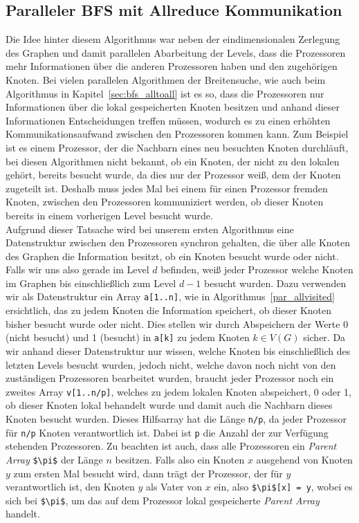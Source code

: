 \documentclass[11pt,a4paper]{article}
\begin{document}
\subsection{Paralleler BFS mit Allreduce Kommunikation}
\label{sec:bfs_allreduce}
Die Idee hinter diesem Algorithmus war neben der eindimensionalen Zerlegung des Graphen und damit parallelen Abarbeitung der Levels, dass die Prozessoren mehr Informationen über die anderen Prozessoren haben und den zugehörigen Knoten. Bei vielen parallelen Algorithmen der Breitensuche, wie auch beim Algorithmus in Kapitel~\ref{sec:bfs_alltoall} ist es so, dass die Prozessoren nur Informationen über die lokal gespeicherten Knoten besitzen und anhand dieser Informationen Entscheidungen treffen müssen, wodurch es zu einen erhöhten Kommunikationsaufwand zwischen den Prozessoren kommen kann. Zum Beispiel ist es einem Prozessor, der die Nachbarn eines neu besuchten Knoten durchläuft, bei diesen Algorithmen nicht bekannt, ob ein Knoten, der nicht zu den lokalen gehört, bereits besucht wurde, da dies nur der Prozessor weiß, dem der Knoten zugeteilt ist. Deshalb muss jedes Mal bei einem für einen Prozessor fremden Knoten, zwischen den Prozessoren kommuniziert werden, ob dieser Knoten bereits in einem vorherigen Level besucht wurde.\\
Aufgrund dieser Tatsache wird bei unserem ersten Algorithmus eine Datenstruktur zwischen den Prozessoren synchron gehalten, die über alle Knoten des Graphen die Information besitzt, ob ein Knoten besucht wurde oder nicht. Falls wir uns also gerade im Level \(d\) befinden, weiß jeder Prozessor welche Knoten im Graphen bis einschließlich zum Level \(d-1\) besucht wurden. Dazu verwenden wir als Datenstruktur ein Array \lstinline{a[1..n]}, wie in Algorithmus~\ref{par_allvisited} ersichtlich, das zu jedem Knoten die Information speichert, ob dieser Knoten bisher besucht wurde oder nicht. Dies stellen wir durch Abspeichern der Werte 0 (nicht besucht) und 1 (besucht) in \lstinline{a[k]} zu jedem Knoten \(k \in V(G)\) sicher. Da wir anhand dieser Datenstruktur nur wissen, welche Knoten bis einschließlich des letzten Levels besucht wurden, jedoch nicht, welche davon noch nicht von den zuständigen Prozessoren bearbeitet wurden, braucht jeder Prozessor noch ein zweites Array \lstinline{v[1..n/p]}, welches zu jedem lokalen Knoten abspeichert, 0 oder 1, ob dieser Knoten lokal behandelt wurde und damit auch die Nachbarn dieses Knoten besucht wurden. Dieses Hilfsarray hat die Länge \lstinline{n/p}, da jeder Prozessor für \lstinline{n/p} Knoten verantwortlich ist. Dabei ist \lstinline{p} die Anzahl der zur Verfügung stehenden Prozessoren. Zu beachten ist auch, dass alle Prozessoren ein \textit{Parent Array} \lstinline{$\pi$} der Länge \(n\) besitzen. Falls also ein Knoten \(x\) ausgehend von Knoten \(y\) zum ersten Mal besucht wird, dann trägt der Prozessor, der für \(y\) verantwortlich ist, den Knoten \(y\) als Vater von \(x\) ein, also \lstinline{$\pi$[x] = y}, wobei es sich bei \lstinline{$\pi$}, um das auf dem Prozessor lokal gespeicherte \textit{Parent Array} handelt.
\end{document}
